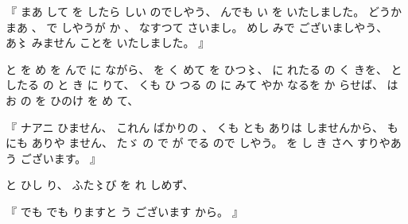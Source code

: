 %
『
まあ
して
を
したら
しい
のでしやう、
%
んでも
い
を
いたしました。
%
どうか
まあ
、
%
で
しやうが
か
、
%
なすつて
さいまし。
%
めし
みで
ございましやう、
%
あ〻%
みません
ことを
いたしました。
』

%
と
を
め
を
んで
に%
ながら、
%
を
く
めて%
を
ひつ〻、%
%
に
れたる
の
く
きを、
%
と
したる
の
と
き
に
りて、
%
くも
ひ
つる
の
に
みて
やか
なるを
か
らせば、
%
は
お
の
を
ひのけ
を
め%
て、

%
『
ナアニ
ひません、
%
これん
ばかりの
、
%
くも
とも
ありは
しませんから、
%
も%
にも
ありや
ません、
%
たゞ%
の
で
が
でる
ので
しやう。
%
を
し
き%
さへ
すりやあ
う
ございます。
』

%
と
ひし
り、
%
ふた〻び%
を
れ
しめず、

%
『
でも
でも
りますと
う
ございます
から。
』

